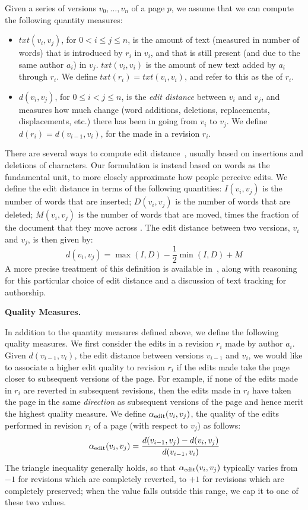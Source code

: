Given a series of versions $v_0,\ldots,v_n$ of a page $p$, we assume
that we can compute the following quantity measures:
%
\begin{itemize}

\item $txt(v_i, v_j)$, for $0 < i \le j \le n$, is the amount of
	text (measured in number of words) that is introduced by
	$r_i$ in $v_i$, and that is still present (and due to the same
	author $a_i$) in $v_j$.
	$txt(v_i,v_i)$ is the amount of new text added by $a_i$ through
	$r_i$.
	We define $txt(r_i) = txt(v_i,v_i)$, and refer to this
	as the  of $r_i$.

\item $d(v_i, v_j)$, for $0 \le i < j \le n$, is the
	\textit{edit distance} between $v_i$ and $v_j$,
	and measures how much change
	(word additions, deletions, replacements, displacements, etc.)
	there has been in going from $v_i$ to $v_j$.
	We define $d(r_i) = d(v_{i-1}, v_i)$, for the 
	made in a revision $r_i$.
\end{itemize}
%
There are several ways to compute edit distance~\cite{Levenshtein66,TichyEditDist},
usually based on insertions and deletions of characters.
Our formulation is instead based on words as the fundamental unit,
to more closely approximate how people perceive edits.
We define the edit distance in terms of the following quantities:
$I(v_i, v_j)$ is the number of words that are inserted;
$D(v_i, v_j)$ is the number of words that are deleted;
$M(v_i, v_j)$ is the number of words that are moved, times the fraction
of the document that they move across \cite{Adler2007}.
The edit distance between two versions, $v_i$ and $v_j$, is
then given by:
%
\[
d(v_i, v_j) = \max(I, D) - \frac{1}{2}\min(I, D) + M
\]
%
A more precise treatment of this definition is available
in~\cite{Adler2007}, along with reasoning for this particular
choice of edit distance and a discussion of text tracking
for authorship.


\smallskip

\noindent\textbf{Quality Measures.}

In addition to the quantity measures defined above, we define the
following quality measures.
We first consider the edits in a revision $r_i$ made by author
$a_i$.
Given $d(v_{i-1}, v_i)$, the edit distance between versions
$v_{i-1}$ and $v_i$, we would like to associate a higher edit
quality to revision $r_i$ if the edits made take the page
closer to subsequent versions of the page.
For example, if none of the edits made in $r_i$ are reverted
in subsequent revisions, then the edits made in $r_i$
have taken the page in the same {\em direction\/} as subsequent 
versions of the page and hence merit the highest quality measure.
We define $\alpha_\text{edit}(v_i, v_j)$, the quality of the edits
performed in revision $r_i$ of a page (with respect to $v_j$) as follows:
%
\[
\alpha_\text{edit}(v_i, v_j) = 
\frac{d(v_{i-1}, v_j) - d(v_i, v_j)}{d(v_{i-1}, v_i)}
\]
%
The triangle inequality generally holds, so that
$\alpha_\text{edit}(v_i, v_j)$ typically varies from
$-1$ for revisions which are completely reverted,
to $+1$ for revisions which are completely preserved;
when the value falls outside this range, we
cap it to one of these two values.

